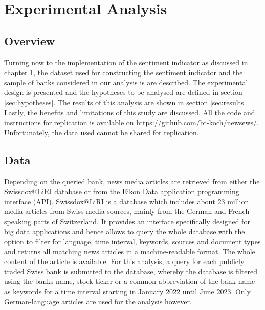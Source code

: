 \chapter{Experimental Analysis}\label{sec5}
\thispagestyle{empty}

\section{Overview}

Turning now to the implementation of the sentiment indicator as discussed in chapter \ref{sec5}, the dataset used for constructing the sentiment indicator and the sample of banks considered in our analysis is are described. The experimental design is presented and the hypotheses to be analysed are defined in section \ref{sec:hypotheses}. The results of this analysis are shown in section \ref{sec:results}. Lastly, the benefits and limitations of this study are discussed. All the code and instructions for replication is available on \url{https://github.com/bt-koch/newsews/}. Unfortunately, the data used cannot be shared for replication.

\section{Data}

Depending on the queried bank, news media articles are retrieved from either the Swissdox@LiRI database or from the Eikon Data application programming interface (API). Swissdox@LiRI is a database which includes about 23 million media articles from Swiss media sources, mainly from the German and French speaking parts of Switzerland. It provides an interface specifically designed for big data applications and hence allows to query the whole database with the option to filter for language, time interval, keywords, sources and document types and returns all matching news articles in a machine-readable format. The whole content of the article is available. For this analysis, a query for each publicly traded Swiss bank is submitted to the database, whereby the database is filtered using the banks name, stock ticker or a common abbreviation of the bank name as keywords for a time interval starting in January 2022 until June 2023. Only German-language articles are used for the analysis however. \\

